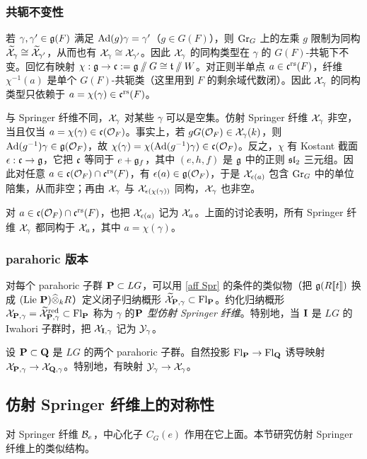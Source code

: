 \subsubsection{共轭不变性} 若 $\gamma,\gamma'\in\frg(F)$ 满足 $\Ad(g)\gamma=\gamma'$（$g\in G(F)$），则 $\Gr_{G}$ 上的左乘 $g$ 限制为同构 $\tX_{\gamma}\cong\tX_{\gamma'}$，从而也有 $\sX_{\gamma}\cong\sX_{\gamma'}$。因此 $\sX_{\gamma}$ 的同构类型在 $\gamma$ 的 $G(F)$-共轭下不变。回忆有映射 $\chi:\frg\to \frc:=\frg\sslash G\cong\frt\sslash W$。对正则半单点 $a\in\frc^{\rs}(F)$，纤维 $\chi^{-1}(a)$ 是单个 $G(F)$-共轭类（这里用到 $F$ 的剩余域代数闭）。因此 $\sX_{\gamma}$ 的同构类型只依赖于 $a=\chi(\gamma)\in\frc^{\rs}(F)$。

与 Springer 纤维不同，$\sX_{\gamma}$ 对某些 $\gamma$ 可以是空集。仿射 Springer 纤维 $\sX_{\gamma}$ 非空，当且仅当 $a=\chi(\gamma)\in\frc(\calO_{F})$。事实上，若 $gG(\calO_{F})\in\sX_{\gamma}(k)$，则 $\Ad(g^{-1})\gamma\in\frg(\calO_{F})$，故 $\chi(\gamma)=\chi(\Ad(g^{-1})\gamma)\in\frc(\calO_{F})$。反之，$\chi$ 有 Kostant 截面 $\ep: \frc\to \frg$，它把 $\frc$ 等同于 $e+\frg_{f}$，其中 $(e,h,f)$ 是 $\frg$ 中的正则 $\sl_{2}$ 三元组。因此对任意 $a\in\frc(\calO_{F})\cap\frc^{\rs}(F)$，有 $\ep(a)\in\frg(\calO_{F})$，于是 $\sX_{\ep(a)}$ 包含 $\Gr_{G}$ 中的单位陪集，从而非空；再由 $\sX_{\gamma}$ 与 $\sX_{\ep(\chi(\gamma))}$ 同构，$\sX_{\gamma}$ 也非空。

对 $a\in\frc(\calO_{F})\cap\frc^{\rs}(F)$，也把 $\sX_{\ep(a)}$ 记为 $\sX_{a}$。上面的讨论表明，所有 Springer 纤维 $\sX_{\gamma}$ 都同构于 $\sX_{a}$，其中 $a=\chi(\gamma)$。

\subsubsection{parahoric 版本} 对每个 parahoric 子群 $\bP\subset LG$，可以用 \eqref{aff Spr} 的条件的类似物（把 $\frg(R\tl{t})$ 换成 $(\Lie\bP)\widehat{\otimes}_{k}R$）定义闭子归纳概形 $\tX_{\bP,\gamma}\subset\Fl_{\bP}$。约化归纳概形 $\sX_{\bP,\gamma}=\tX_{\bP,\gamma}^{\red}\subset\Fl_{\bP}$ 称为 $\gamma$ 的{\em $\bP$ 型仿射 Springer 纤维}。特别地，当 $\bI$ 是 $LG$ 的 Iwahori 子群时，把 $\sX_{\bI,\gamma}$ 记为 $\sY_{\gamma}$。

设 $\bP\subset\bQ$ 是 $LG$ 的两个 parahoric 子群。自然投影 $\Fl_{\bP}\to \Fl_{\bQ}$ 诱导映射 $\sX_{\bP,\gamma}\to \sX_{\bQ,\gamma}$。特别地，有映射 $\sY_{\gamma}\to \sX_{\gamma}$。

\subsection{仿射 Springer 纤维上的对称性}
对 Springer 纤维 $\sB_{e}$，中心化子 $C_{G}(e)$ 作用在它上面。本节研究仿射 Springer 纤维上的类似结构。

